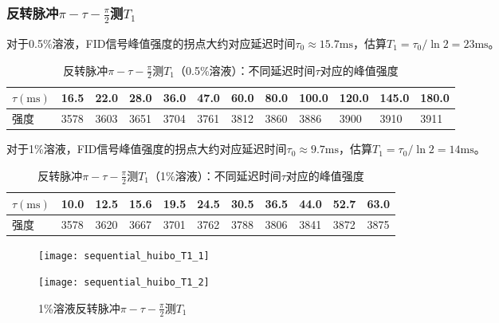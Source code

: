 \documentclass[aps,pre,12pt,preprint,onecolumn,showpacs,showkeys]{revtex4-1}
\begin{document}
        \subsubsection{反转脉冲$\pi-\tau-\frac{\pi}{2}$测$T_1$}
        对于0.5\%溶液，FID信号峰值强度的拐点大约对应延迟时间$\tau_0\approx15.7\mathrm{ms}$，估算$T_1=\tau_0/\ln2=23\mathrm{ms}$。

        \begin{table}[h]
            \caption{\label{tab:fanzhuan_T1_1}%
            反转脉冲$\pi-\tau-\frac{\pi}{2}$测$T_1$（0.5\%溶液）：不同延迟时间$\tau$对应的峰值强度}
            \begin{tabular}{|l|l|l|l|l|l|l|l|l|l|l|l|}
                \hline
                $\tau(\mathrm{ms})$&16.5&22.0&28.0&36.0&47.0&60.0&80.0&100.0&120.0&145.0&180.0\\\hline
                强度&3578&3603&3651&3704&3761&3812&3860&3886&3900&3910&3911\\\hline
            \end{tabular}
        \end{table}

        对于1\%溶液，FID信号峰值强度的拐点大约对应延迟时间$\tau_0\approx9.7\mathrm{ms}$，估算$T_1=\tau_0/\ln2=14\mathrm{ms}$。

        \begin{table}[h]
            \caption{\label{tab:fanzhuan_T1_2}%
            反转脉冲$\pi-\tau-\frac{\pi}{2}$测$T_1$（1\%溶液）：不同延迟时间$\tau$对应的峰值强度}
            \begin{tabular}{|l|l|l|l|l|l|l|l|l|l|l|}
                \hline
                $\tau(\mathrm{ms})$&10.0&12.5&15.6&19.5&24.5&30.5&36.5&44.0&52.7&63.0\\\hline
                强度&3578&3620&3667&3701&3762&3788&3806&3841&3872&3875\\\hline
            \end{tabular}
        \end{table}

        \begin{figure}[ht]
            \begin{minipage}{.6\textwidth}
                \centering
                \texttt{[image: sequential\_huibo\_T1\_1]}
                \caption{\label{fig:sequential_huibo_T1_1}%
                0.5\%溶液反转脉冲$\pi-\tau-\frac{\pi}{2}$测$T_1$}
            \end{minipage}%
            \begin{minipage}{0.4\textwidth}
                \centering
                \texttt{[image: sequential\_huibo\_T1\_2]}
                \caption{\label{fig:sequential_huibo_T1_2}%
                1\%溶液反转脉冲$\pi-\tau-\frac{\pi}{2}$测$T_1$}
            \end{minipage}
        \end{figure}
\end{document}
